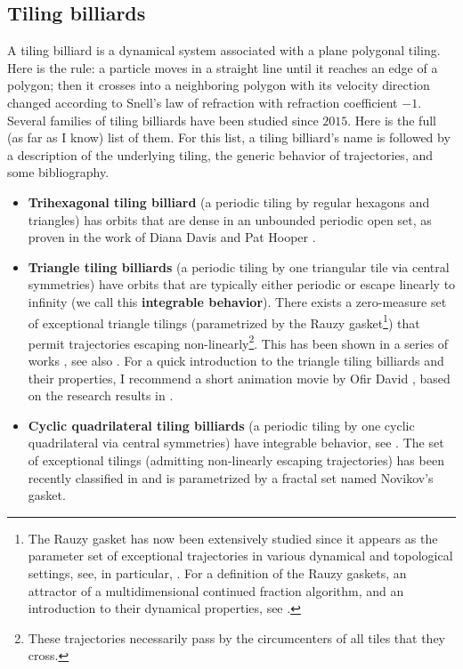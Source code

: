 \documentclass[11pt]{article}
\theoremstyle{definition}
\begin{document}
\subsection*{Tiling billiards}
A tiling billiard is a dynamical system associated with a plane polygonal tiling. Here is the rule: a particle moves in a straight line until it reaches an edge of a polygon; then it crosses into a neighboring polygon with its velocity direction changed according to Snell's law of refraction with refraction coefficient $-1$. Several families of tiling billiards have been studied since $2015$. Here is the full (as far as I know) list of them. For this list, a tiling billiard's name is followed by a description of the underlying tiling, the generic behavior of trajectories, and some bibliography.
\begin{itemize}
    \item [1.] \textbf{Trihexagonal tiling billiard} (a periodic tiling by regular hexagons and triangles) has orbits that are dense in an unbounded periodic open set, as proven in the work of Diana Davis and Pat Hooper \cite{DH18}.
    
    \item [2.] \textbf{Triangle tiling billiards} (a periodic tiling by one triangular tile via central symmetries) have orbits that are typically either periodic or escape linearly to infinity (we call this \textbf{integrable behavior}). There exists a zero-measure set of exceptional triangle tilings (parametrized by the Rauzy gasket\footnote{The Rauzy gasket has now been extensively studied since it appears as the parameter set of exceptional trajectories in various dynamical and topological settings, see, in particular, \cite{AR91, AHS, DDe}. For a definition of the Rauzy gaskets, an attractor of a multidimensional continued fraction algorithm, and an introduction to their dynamical properties, see \cite{AS}.}) that permit trajectories escaping non-linearly\footnote{These trajectories necessarily pass by the circumcenters of all tiles that they cross.}. This has been shown in a series of works \cite{BDFI18, TAF, H_Paro}, see also \cite{highlights_O}. For a quick introduction to the triangle tiling billiards and their properties, I recommend a short animation movie by Ofir David \cite{Ofir}, based on the research results in \cite{TAF}.
    
    \item [3.] \textbf{Cyclic quadrilateral tiling billiards} (a periodic tiling by one cyclic quadrilateral via central symmetries) have integrable behavior, see \cite{H_Paro, TAF}. The set of exceptional tilings (admitting non-linearly escaping trajectories) has been recently classified in \cite{Dynnikovetal} and is parametrized by a fractal set named Novikov's gasket.
    

\end{itemize}
\end{document}
